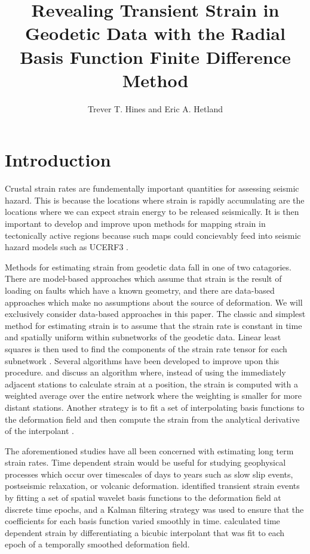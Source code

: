 \documentclass[10pt,a4paper]{article}
\title{Revealing Transient Strain in Geodetic Data with the Radial Basis Function Finite Difference Method}
\author{Trever T. Hines and Eric A. Hetland}
\begin{document}
\maketitle


\section{Introduction}\label{sec:Introduction}
Crustal strain rates are fundementally important quantities for assessing seismic hazard. This is because the locations where strain is rapidly accumulating are the locations where we can expect strain energy to be released seismically.  It is then important to develop and improve upon methods for mapping strain in tectonically active regions because such maps could concievably feed into seismic hazard models such as UCERF3 \citep{Field2014}. 

Methods for estimating strain from geodetic data fall in one of two catagories.  There are model-based approaches which assume that strain is the result of loading on faults which have a known geometry, and there are data-based approaches which make no assumptions about the source of deformation.  We will exclusively consider data-based approaches in this paper.  The classic and simplest method for estimating strain is to assume that the strain rate is constant in time and spatially uniform within subnetworks of the geodetic data.  Linear least squares is then used to find the components of the strain rate tensor for each subnetwork \citep[e.g][]{Frank1966,Prescott1976,Savage1986,Feigl1990,Murray2000}. Several algorithms have been developed to improve upon this procedure. \citet{Shen1996} and \citet{Shen2015} discuss an algorithm where, instead of using the immediately adjacent stations to calculate strain at a position, the strain is computed with a weighted average over the entire network where the weighting is smaller for more distant stations.  Another strategy is to fit a set of interpolating basis functions to the deformation field and then compute the strain from the analytical derivative of the interpolant \citep[e.g.][]{Beavan2001,Tape2009,Sandwell2016}.  

The aforementioned studies have all been concerned with estimating long term strain rates. Time dependent strain would be useful for studying geophysical processes which occur over timescales of days to years such as slow slip events, postseismic relaxation, or volcanic deformation.  \citet{Ohtani2010} identified transient strain events by fitting a set of spatial wavelet basis functions to the deformation field at discrete time epochs, and a Kalman filtering strategy was used to ensure that the coefficients for each basis function varied smoothly in time. \citet{Holt2013} calculated time dependent strain by differentiating a bicubic interpolant that was fit to each epoch of a temporally smoothed deformation field. 
\end{document}
